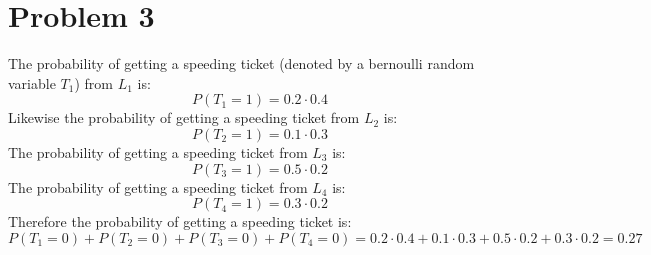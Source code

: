 \section*{Problem 3}
The probability of getting a speeding ticket (denoted by a bernoulli random variable $T_1$) from 
$L_1$ is:
$$P(T_1=1)=0.2\cdot0.4$$
Likewise the probability of getting a speeding ticket from $L_2$ is:
$$P(T_2=1)=0.1\cdot0.3$$
The probability of getting a speeding ticket from $L_3$ is:
$$P(T_3=1)=0.5\cdot0.2$$
The probability of getting a speeding ticket from $L_4$ is:
$$P(T_4=1)=0.3\cdot0.2$$
Therefore the probability of getting a speeding ticket is:
$$P(T_1=0)+P(T_2=0)+P(T_3=0)+P(T_4=0)=0.2\cdot0.4+0.1\cdot0.3+0.5\cdot0.2+0.3\cdot0.2=\boxed{0.27}$$


